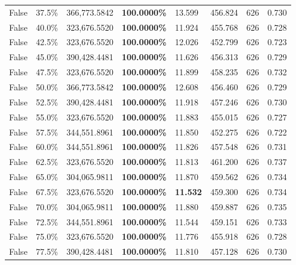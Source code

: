 \begin{table}[H]
\begin{tabular}{lllrllll}
\cline{1-8}
False & 37.5\% & 366,773.5842 & \bfseries \color{red} 100.0000\% & 13.599 & 456.824 & 626 & 0.730 \\
\cline{1-8}
False & 40.0\% & 323,676.5520 & \bfseries \color{red} 100.0000\% & 11.924 & 455.768 & 626 & 0.728 \\
\cline{1-8}
False & 42.5\% & 323,676.5520 & \bfseries \color{red} 100.0000\% & 12.026 & 452.799 & 626 & 0.723 \\
\cline{1-8}
False & 45.0\% & 390,428.4481 & \bfseries \color{red} 100.0000\% & 11.626 & 456.313 & 626 & 0.729 \\
\cline{1-8}
False & 47.5\% & 323,676.5520 & \bfseries \color{red} 100.0000\% & 11.899 & 458.235 & 626 & 0.732 \\
\cline{1-8}
False & 50.0\% & 366,773.5842 & \bfseries \color{red} 100.0000\% & 12.608 & 456.460 & 626 & 0.729 \\
\cline{1-8}
False & 52.5\% & 390,428.4481 & \bfseries \color{red} 100.0000\% & 11.918 & 457.246 & 626 & 0.730 \\
\cline{1-8}
False & 55.0\% & 323,676.5520 & \bfseries \color{red} 100.0000\% & 11.883 & 455.015 & 626 & 0.727 \\
\cline{1-8}
False & 57.5\% & 344,551.8961 & \bfseries \color{red} 100.0000\% & 11.850 & 452.275 & 626 & 0.722 \\
\cline{1-8}
False & 60.0\% & 344,551.8961 & \bfseries \color{red} 100.0000\% & 11.826 & 457.548 & 626 & 0.731 \\
\cline{1-8}
False & 62.5\% & 323,676.5520 & \bfseries \color{red} 100.0000\% & 11.813 & 461.200 & 626 & 0.737 \\
\cline{1-8}
False & 65.0\% & \color{red} 304,065.9811 & \bfseries \color{red} 100.0000\% & 11.870 & 459.562 & 626 & 0.734 \\
\cline{1-8}
False & 67.5\% & 323,676.5520 & \bfseries \color{red} 100.0000\% & \bfseries \color{red} 11.532 & 459.300 & 626 & 0.734 \\
\cline{1-8}
False & 70.0\% & \color{red} 304,065.9811 & \bfseries \color{red} 100.0000\% & 11.880 & 459.887 & 626 & 0.735 \\
\cline{1-8}
False & 72.5\% & 344,551.8961 & \bfseries \color{red} 100.0000\% & 11.544 & 459.151 & 626 & 0.733 \\
\cline{1-8}
False & 75.0\% & 323,676.5520 & \bfseries \color{red} 100.0000\% & 11.776 & 455.918 & 626 & 0.728 \\
\cline{1-8}
False & 77.5\% & 390,428.4481 & \bfseries \color{red} 100.0000\% & 11.810 & 457.128 & 626 & 0.730 \\

\end{tabular}
\end{table}
